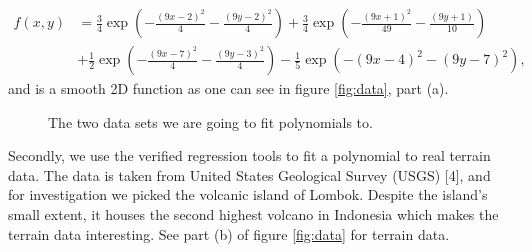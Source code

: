 \begin{align*}
f(x,y) &= \frac{3}{4}\exp{\left(-\frac{(9x-2)^2}{4} - \frac{(9y-2)^2}{4}\right)}+\frac{3}{4}\exp{\left(-\frac{(9x+1)^2}{49}- \frac{(9y+1)}{10}\right)} \\
&+\frac{1}{2}\exp{\left(-\frac{(9x-7)^2}{4} - \frac{(9y-3)^2}{4}\right)} -\frac{1}{5}\exp{\left(-(9x-4)^2 - (9y-7)^2\right) },
\end{align*}
and is a smooth 2D function as one can see in figure \eqref{fig:data}, part (a).

 \begin{figure} [h]%
    \centering
    \caption{The two data sets we are going to fit polynomials to.}%
    \label{fig:data}%
 \end{figure}

Secondly, we use the verified regression tools to fit a polynomial to real terrain data. The data is taken from United States Geological Survey (USGS) [4],  and for investigation we picked the volcanic island of Lombok. Despite the island's small extent, it houses the second highest volcano in Indonesia which makes the terrain data interesting. See part (b) of figure \eqref{fig:data} for terrain data.

